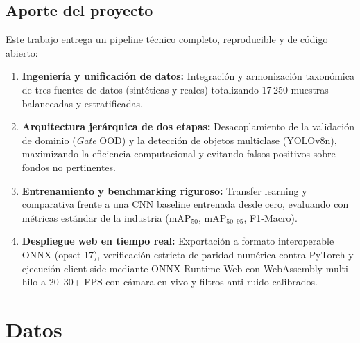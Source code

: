 \documentclass[11pt,a4paper]{article}
\begin{document}
\subsection{Aporte del proyecto}
Este trabajo entrega un pipeline técnico completo, reproducible y de código abierto:
\begin{enumerate}[leftmargin=1.6em,itemsep=0.15em]
  \item \textbf{Ingeniería y unificación de datos:} Integración y armonización
  taxonómica de tres fuentes de datos (sintéticas y reales) totalizando 17\,250
  muestras balanceadas y estratificadas.
  \item \textbf{Arquitectura jerárquica de dos etapas:} Desacoplamiento de la
  validación de dominio (\emph{Gate} OOD) y la detección de objetos multiclase
  (YOLOv8n), maximizando la eficiencia computacional y evitando falsos positivos
  sobre fondos no pertinentes.
  \item \textbf{Entrenamiento y benchmarking riguroso:} Transfer learning y
  comparativa frente a una CNN baseline entrenada desde cero, evaluando con métricas
  estándar de la industria ($\text{mAP}_{50}$, $\text{mAP}_{50\text{--}95}$, F1-Macro).
  \item \textbf{Despliegue web en tiempo real:} Exportación a formato interoperable
  ONNX (opset 17), verificación estricta de paridad numérica contra PyTorch y
  ejecución client-side mediante ONNX Runtime Web con WebAssembly multi-hilo a
  20--30+ FPS con cámara en vivo y filtros anti-ruido calibrados.
\end{enumerate}

\section{Datos}
\end{document}
